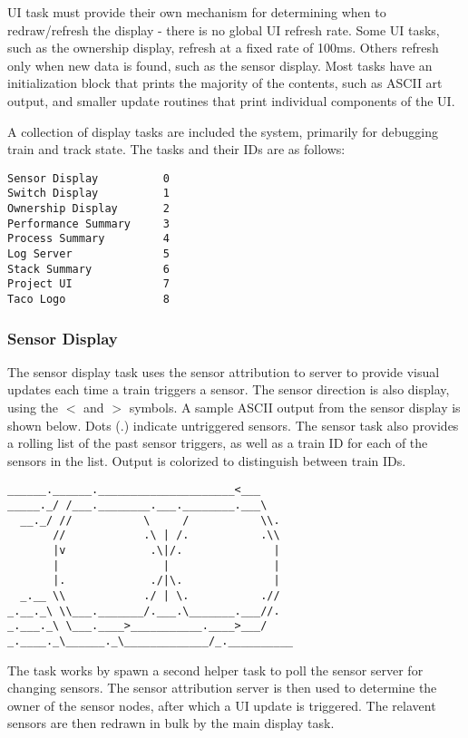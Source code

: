 \documentclass[twoside,a4paper]{refart}
\begin{document}
UI task must provide their own mechanism for determining when to redraw/refresh the display - there is no global UI refresh rate. Some UI tasks, such as the ownership display, refresh at a fixed rate of 100ms. Others refresh only when new data is found, such as the sensor display. Most tasks have an initialization block that prints the majority of the contents, such as ASCII art output, and smaller update routines that print individual components of the UI.

A collection of display tasks are included the system, primarily for debugging train and track state. The tasks and their IDs are as follows:
\begin{verbatim}
Sensor Display          0
Switch Display          1
Ownership Display       2
Performance Summary     3
Process Summary         4
Log Server              5
Stack Summary           6
Project UI              7
Taco Logo               8
\end{verbatim}
\subsubsection{Sensor Display}

The sensor display task uses the sensor attribution to server to provide visual updates each time a train triggers a sensor. The sensor direction is also display, using the $<$ and $>$ symbols. A sample ASCII output from the sensor display is shown below. Dots ($.$) indicate untriggered sensors. The sensor task also provides a rolling list of the past sensor triggers, as well as a train ID for each of the sensors in the list. Output is colorized to distinguish between train IDs.

\begin{verbatim}
______.______._____________________<___    
_____._/ /___.________.___.________.___\ 
  __._/ //           \     /           \\.
       //            .\ | /.           .\\ 
       |v             .\|/.              |  
       |                |                |   
       |.             ./|\.              |   
  _.__ \\            ./ | \.           .// 
_.__._\ \\___._______/.___.\_______.___//.
_.___._\ \___.____>___________.____>___/  
_.____._\______._\_____________/_.__________
\end{verbatim}

The task works by spawn a second helper task to poll the sensor server for changing sensors. The sensor attribution server is then used to determine the owner of the sensor nodes, after which a UI update is triggered. The relavent sensors are then redrawn in bulk by the main display task.
\end{document}
